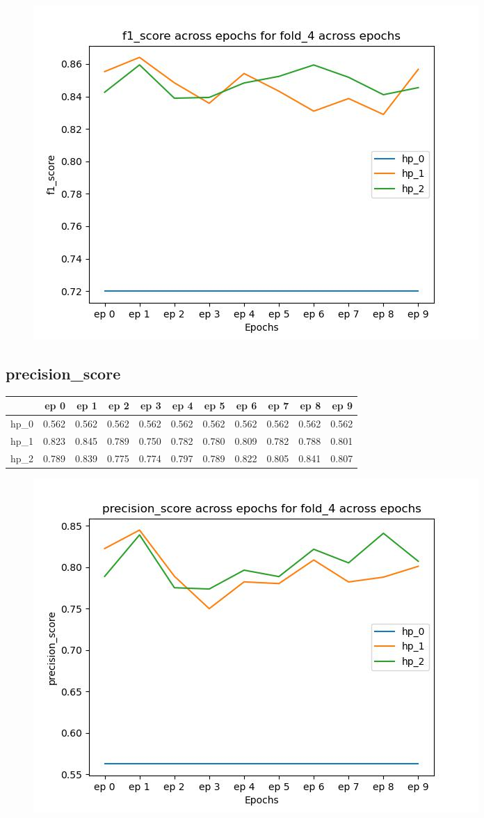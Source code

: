 \documentclass{article}
\begin{document}
\begin{figure}[H]
\includegraphics[scale = 0.75]{fold_4/f1_score}
\end{figure}
\subsection{precision\_score}
\begin{tabular}{lrrrrrrrrrr}
\toprule
{} &   ep 0 &   ep 1 &   ep 2 &   ep 3 &   ep 4 &   ep 5 &   ep 6 &   ep 7 &   ep 8 &   ep 9 \\
\midrule
hp\_0 &  0.562 &  0.562 &  0.562 &  0.562 &  0.562 &  0.562 &  0.562 &  0.562 &  0.562 &  0.562 \\
hp\_1 &  0.823 &  0.845 &  0.789 &  0.750 &  0.782 &  0.780 &  0.809 &  0.782 &  0.788 &  0.801 \\
hp\_2 &  0.789 &  0.839 &  0.775 &  0.774 &  0.797 &  0.789 &  0.822 &  0.805 &  0.841 &  0.807 \\
\bottomrule
\end{tabular}

\begin{figure}[H]
\includegraphics[scale = 0.75]{fold_4/precision_score}
\end{figure}
\end{document}
